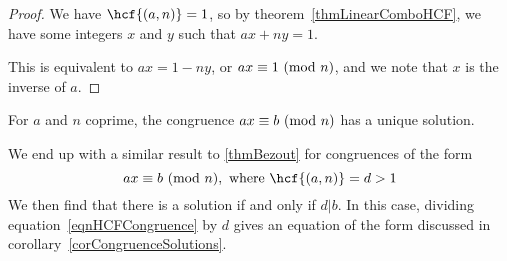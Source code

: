 \documentclass[../Main.tex]{subfiles}
\begin{document}
\begin{proof}
    We have $\hcf{(a, n)} = 1$, so by theorem~\ref{thmLinearComboHCF}, we have some integers $x$ and $y$ such that $ax + ny = 1$.\par
    This is equivalent to $ax = 1 - ny$, or $ax \equiv 1~(\text{mod}~{n})$, and we note that $x$ is the inverse of $a$.
\end{proof}
\begin{corollary}
    For $a$ and $n$ coprime, the congruence $ax \equiv b~(\text{mod}~{n})$ has a unique solution.
    \label{corCongruenceSolutions}
\end{corollary}
We end up with a similar result to \ref{thmBezout} for congruences of the form
\begin{equation}
    \congruence{ax}{b}{n}, \text{ where } \hcf{(a, n)} = d > 1
    \label{eqnHCFCongruence}
\end{equation}
We then find that there is a solution if and only if $d | b$. In this case, dividing equation~\ref{eqnHCFCongruence} by $d$ gives an equation of the form discussed in corollary~\ref{corCongruenceSolutions}.
\end{document}
